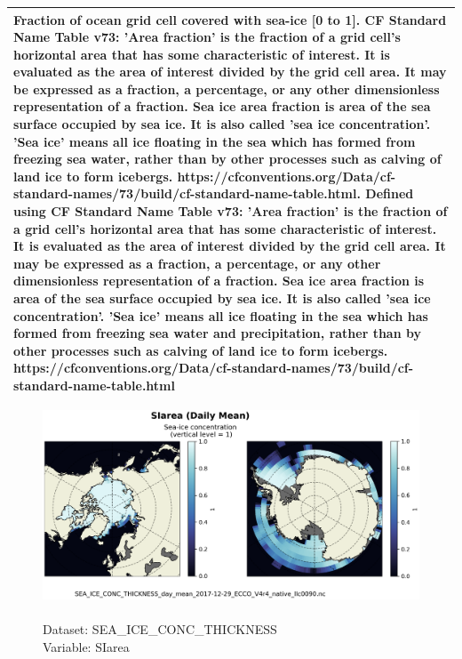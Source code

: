 \begin{longtable}{|p{}|p{}|p{}|p{}|}
\multicolumn{4}{|p{1\textwidth}|}{Fraction of ocean grid cell covered with sea-ice [0 to 1]. CF Standard Name Table v73:  'Area fraction' is the fraction of a grid cell's horizontal area that has some characteristic of interest. It is evaluated as the area of interest divided by the grid cell area. It may be expressed as a fraction, a percentage, or any other dimensionless representation of a fraction. Sea ice area fraction is area of the sea surface occupied by sea ice. It is also called 'sea ice concentration'. 'Sea ice' means all ice floating in the sea which has formed from freezing sea water, rather than by other processes such as calving of land ice to form icebergs. https://cfconventions.org/Data/cf-standard-names/73/build/cf-standard-name-table.html. Defined using CF Standard Name Table v73: 'Area fraction' is the fraction of a grid cell's horizontal area that has some characteristic of interest. It is evaluated as the area of interest divided by the grid cell area. It may be expressed as a fraction, a percentage, or any other dimensionless representation of a fraction. Sea ice area fraction is area of the sea surface occupied by sea ice. It is also called 'sea ice concentration'. 'Sea ice' means all ice floating in the sea which has formed from freezing sea water and precipitation, rather than by other processes such as calving of land ice to form icebergs. https://cfconventions.org/Data/cf-standard-names/73/build/cf-standard-name-table.html} \\ \hline
\end{longtable}

\begin{figure}[H]
\centering
\includegraphics[scale=0.5]{../images/plots/native_plots/Sea-Ice_and_Snow_Concentration_and_Thickness/SIarea.png}
\caption{\\Dataset: SEA\_ICE\_CONC\_THICKNESS\\Variable: SIarea}
\label{tab:table-SEA_ICE_CONC_THICKNESS_SIarea-Plot}
\end{figure}
\pagebreak
